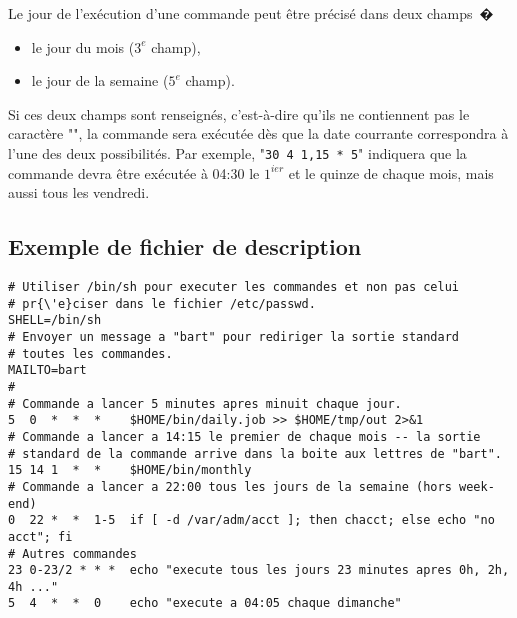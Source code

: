 \begin{remarque}
Le jour de l'ex{\'e}cution d'une commande peut {\^e}tre pr{\'e}cis{\'e} dans deux champs~�
\begin{itemize}
	\item	le jour du mois ($3^e$ champ),
	\item	le jour de la semaine ($5^e$ champ).
\end{itemize}
Si ces deux champs sont renseign{\'e}s, c'est-{\`a}-dire qu'ils ne contiennent pas le
caract{\`e}re "{\tt *}", la commande sera ex{\'e}cut{\'e}e d{\`e}s que la date courrante correspondra
{\`a} l'une des deux possibilit{\'e}s. Par exemple, "{\tt 30 4 1,15 * 5}" indiquera que la
commande devra {\^e}tre ex{\'e}cut{\'e}e {\`a} 04:30 le $1^{ier}$ et le quinze de chaque mois, mais
aussi tous les vendredi.
\end{remarque}

\subsection{Exemple de fichier de description}

\begin{example}
\begin{verbatim}
# Utiliser /bin/sh pour executer les commandes et non pas celui
# pr{\'e}ciser dans le fichier /etc/passwd.
SHELL=/bin/sh
# Envoyer un message a "bart" pour rediriger la sortie standard
# toutes les commandes.
MAILTO=bart
#
# Commande a lancer 5 minutes apres minuit chaque jour.
5  0  *  *  *    $HOME/bin/daily.job >> $HOME/tmp/out 2>&1
# Commande a lancer a 14:15 le premier de chaque mois -- la sortie
# standard de la commande arrive dans la boite aux lettres de "bart".
15 14 1  *  *    $HOME/bin/monthly
# Commande a lancer a 22:00 tous les jours de la semaine (hors week-end)
0  22 *  *  1-5  if [ -d /var/adm/acct ]; then chacct; else echo "no acct"; fi
# Autres commandes
23 0-23/2 * * *  echo "execute tous les jours 23 minutes apres 0h, 2h, 4h ..."
5  4  *  *  0    echo "execute a 04:05 chaque dimanche"
\end{verbatim}
\end{example}
